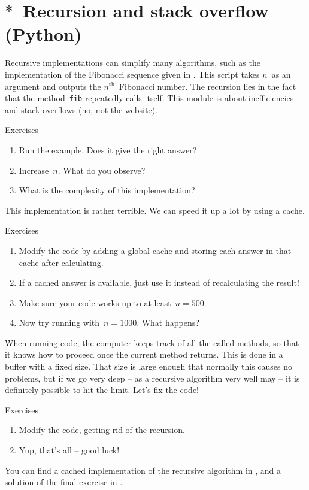 \documentclass[12pt]{article}
\begin{document}
\clearpage
\section{$\ast$~Recursion and stack overflow (Python)}

Recursive implementations can simplify many algorithms, such as the implementation of the Fibonacci sequence given in . This script takes $n$~as an argument and outputs the \ensuremath{n^{\text{th}}}~Fibonacci number. The recursion lies in the fact that the method~\texttt{fib} repeatedly calls itself. This module is about inefficiencies and stack overflows (no, not the website).
%
\begin{mybox}{Exercises}
    \begin{enumerate}
        \item Run the example. Does it give the right answer?
        \item Increase~$n$. What do you observe?
        \item What is the complexity of this implementation?
    \end{enumerate}
\end{mybox}

This implementation is rather terrible. We can speed it up a lot by using a cache.
%
\begin{mybox}{Exercises}
    \begin{enumerate}
        \item Modify the code by adding a global cache and storing each answer in that cache after calculating.
        \item If a cached answer is available, just use it instead of recalculating the result!
        \item Make sure your code works up to at least~$n = 500$.
        \item Now try running with~$n = 1000$. What happens?
    \end{enumerate}
\end{mybox}

When running code, the computer keeps track of all the called methods, so that it knows how to proceed once the current method returns. This is done in a buffer with a fixed size. That size is large enough that normally this causes no problems, but if we go very deep -- as a recursive algorithm very well may -- it is definitely possible to hit the limit. Let's fix the code!
%
\begin{mybox}{Exercises}
    \begin{enumerate}
        \item Modify the code, getting rid of the recursion. 
        \item Yup, that's all -- good luck!
    \end{enumerate}
\end{mybox}
%
You can find a cached implementation of the recursive algorithm in , and a solution of the final exercise in .
\end{document}

